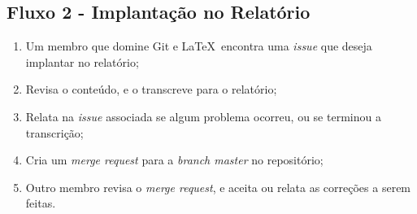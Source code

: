 \subsection{Fluxo 2 - Implantação no Relatório}

\begin{enumerate}
  \item Um membro que domine Git e \LaTeX\ encontra uma \textit{issue} que deseja
  implantar no relatório;
  \item Revisa o conteúdo, e o transcreve para o relatório;
  \item Relata na \textit{issue} associada se algum problema ocorreu, ou se terminou a transcrição;
  \item Cria um \textit{merge request} para a \textit{branch master} no repositório;
  \item Outro membro revisa o \textit{merge request}, e aceita ou relata as correções a serem feitas.
\end{enumerate}

